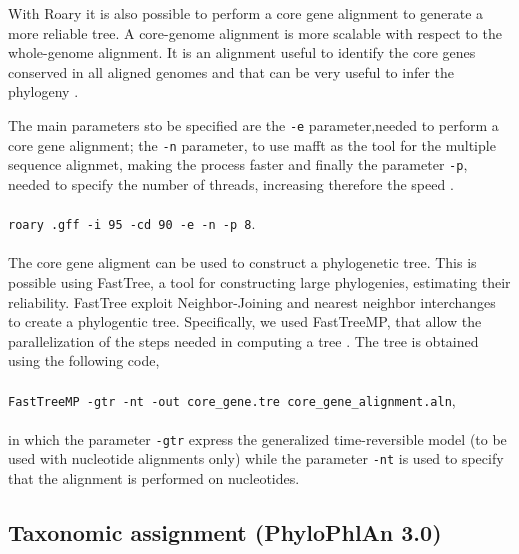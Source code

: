 \documentclass[a4paper,titlepage]{book}
\newcommand{\code}[1]{\colorbox{light-gray}{\texttt{#1}}}
\begin{document}
With Roary it is also possible to perform a core gene alignment to generate a more reliable tree. A core-genome alignment is more scalable with respect to the whole-genome alignment. It is an alignment useful to identify the core genes conserved in all aligned genomes and that can be very useful to infer the phylogeny \cite{Core-align}.

The main parameters sto be specified are the \code{-e} parameter,needed to perform a core gene alignment; the \code{-n} parameter, to use mafft as the tool for the multiple sequence alignmet, making the process faster and finally the parameter \code{-p}, needed to specify the number of threads, increasing therefore the speed \cite{Roary}.
\\
\newline
\\
\code{roary .gff -i 95 -cd 90 -e -n -p 8}.
\\
\newline
\\
The core gene aligment can be used to construct a phylogenetic tree. This is possible using FastTree, a tool for constructing large phylogenies, estimating their reliability. FastTree exploit Neighbor-Joining and nearest neighbor interchanges to create a phylogentic tree. \cite{FastTree}
Specifically, we used FastTreeMP, that allow the parallelization of the steps needed in computing a tree \cite{FTMP}.
The tree is obtained using the following code,\\ \newline \\ \code{FastTreeMP -gtr -nt -out core\_gene.tre core\_gene\_alignment.aln},\\ \newline \\ in which the parameter \code{-gtr} express the generalized time-reversible model (to be used with nucleotide alignments only) while the parameter \code{-nt} is used to specify that the alignment is performed on nucleotides.




\subsection{Taxonomic assignment (PhyloPhlAn 3.0)}
\end{document}
